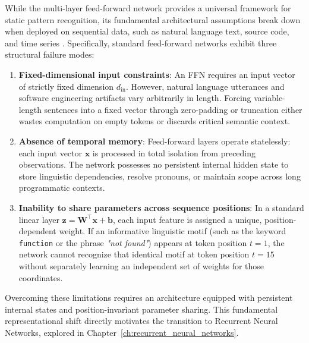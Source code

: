 \documentclass[../../main.tex]{subfiles}
\begin{document}
While the multi-layer feed-forward network provides a universal framework for static pattern recognition, its fundamental architectural assumptions break down when deployed on sequential data, such as natural language text, source code, and time series \citep{goodfellow2016,bishop2024deep}. Specifically, standard feed-forward networks exhibit three structural failure modes:
\begin{enumerate}[label=(\roman*)]
    \item \textbf{Fixed-dimensional input constraints}: An FFN requires an input vector of strictly fixed dimension $d_{\text{in}}$. However, natural language utterances and software engineering artifacts vary arbitrarily in length. Forcing variable-length sentences into a fixed vector through zero-padding or truncation either wastes computation on empty tokens or discards critical semantic context.
    \item \textbf{Absence of temporal memory}: Feed-forward layers operate statelessly: each input vector $\mathbf{x}$ is processed in total isolation from preceding observations. The network possesses no persistent internal hidden state to store linguistic dependencies, resolve pronouns, or maintain scope across long programmatic contexts.
    \item \textbf{Inability to share parameters across sequence positions}: In a standard linear layer $\mathbf{z} = \mathbf{W}^\top \mathbf{x} + \mathbf{b}$, each input feature is assigned a unique, position-dependent weight. If an informative linguistic motif (such as the keyword \texttt{function} or the phrase \textit{"not found"}) appears at token position $t = 1$, the network cannot recognize that identical motif at token position $t = 15$ without separately learning an independent set of weights for those coordinates.
\end{enumerate}

Overcoming these limitations requires an architecture equipped with persistent internal states and position-invariant parameter sharing. This fundamental representational shift directly motivates the transition to Recurrent Neural Networks, explored in Chapter~\ref{ch:recurrent_neural_networks}.

\clearpage
\thispagestyle{empty}
\null
\clearpage
\end{document}
